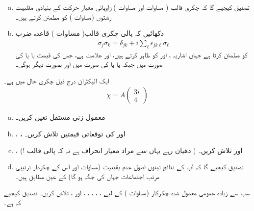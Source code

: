 \begin{enumerate}[a.]
\item
 تصدیق کیجیے گا کہ چکری قالب ( مساوات  اور مساوات ) زاویائی معیار حرکت کے بنیادی مقلبیت رشتوں (مساوات ) کو مطمئن کرتے ہیں۔ 
\item
 دکھائیں کہ پالی چکری قالب( مساوات ) قاعدہ ضرب
\begin{align}
\sigma_j\sigma_k = \delta_{jk}+i\sum_{\ell} \epsilon_{jk\ell}\sigma_{\ell}
\end{align}
 کو مطمئن کرتا ہے جہاں اشاریہ ،  اور  کو ظاہر کرتے ہیں، اور  علامت  ہے، جس کی قیمت  یا  یا  کی صورت میں  جبکہ  یا  یا  کی صورت میں  اور بصورت دیگر  ہوگی۔ 
 \end{enumerate}
ایک الیکٹران درج ذیل چکری حال میں ہے۔
\begin{align*}
\chi =A\begin{pmatrix}
3i \\ 4
\end{pmatrix} 
\end{align*}
\begin{enumerate}[a.]
\item
معمول زنی مستقل  تعین کریں۔
\item
 ، ، اور  کی توقعاتی قیمتیں تلاش کریں۔
\item 
{} ،  اور  تلاش کریں۔ ( دھیان رہے یہاں  سے مراد معیار انحراف ہے نہ کہ پالی قالب !)
\item 
 تصدیق کیجیے گا کہ آپ کے نتائج تینوں اصول عدم یقینیت (مساوات  اور اس کے چکردار ترتیبی مرتب اجتماعات جہاں  کی جگہ  ہو گا) کے عین مطابق ہیں۔
\end{enumerate}
 سب سے زیادہ عمومی معمول شدہ چکرکار  (مساوات ) کے لیے ، ، ، ، ، اور ،
 تلاش کریں۔ تصدیق کیجیے کہ  ہے۔ 
